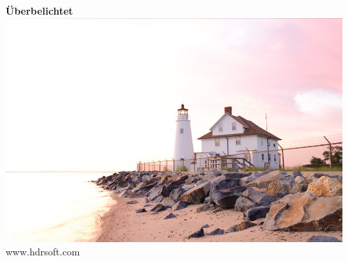 \documentclass{beamer}
\begin{document}
\begin{frame}
\begin{columns}
\begin{column}{0.33\textwidth}
\begin{center}
			\end{center}
		\end{column}
		\begin{column}{0.33\textwidth}
			\begin{center}
			\textbf{Überbelichtet} \\ 
			\vspace{5mm}
			\includegraphics[scale=0.4]{img/bild12.jpg}
			\tiny www.hdrsoft.com
			\end{center}
		\end{column}
	\end{columns}
	\end{frame}
\end{document}
